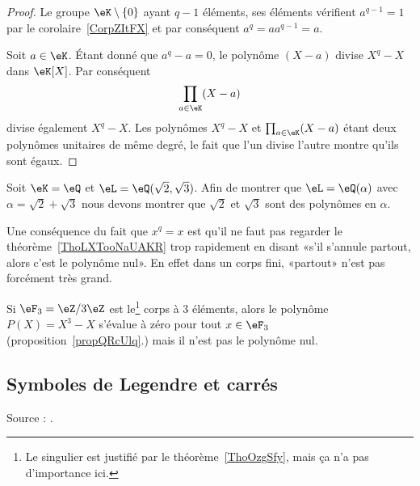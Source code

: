 \begin{proof}
	Le groupe \( \eK\setminus\{ 0 \}\) ayant \( q-1\) éléments, ses éléments vérifient \( a^{q-1}=1\) par le corolaire~\ref{CorpZItFX} et par conséquent \( a^q=aa^{q-1}=a \).

	Soit \( a\in \eK\). Étant donné que \( a^q-a=0\), le polynôme \( (X-a)\) divise \( X^q-X\) dans \( \eK[X]\). Par conséquent
	\begin{equation}
		\prod_{a\in \eK}(X-a)
	\end{equation}
	divise également \( X^q-X\). Les polynômes \( X^q-X\) et \( \prod_{a\in \eK}(X-a)\) étant deux polynômes unitaires de même degré, le fait que l'un divise l'autre montre qu'ils sont égaux.
\end{proof}

\begin{example}
	Soit \( \eK=\eQ\) et \( \eL=\eQ(\sqrt{2},\sqrt{3})\). Afin de montrer que \( \eL=\eQ(\alpha)\) avec \( \alpha=\sqrt{2}+\sqrt{3}\) nous devons montrer que \( \sqrt{2}\) et \( \sqrt{3}\) sont des polynômes en \( \alpha\).
\end{example}

Une conséquence du fait que \( x^q=x\) est qu'il ne faut pas regarder le théorème~\ref{ThoLXTooNaUAKR} trop rapidement en disant «s'il s'annule partout, alors c'est le polynôme nul». En effet dans un corps fini, «partout» n'est pas forcément très grand.

\begin{example}\label{exVQBooBMPLkD}
	Si \( \eF_3=\eZ/3\eZ\) est le\footnote{Le singulier est justifié par le théorème~\ref{ThoOzgSfy}, mais ça n'a pas d'importance ici.} corps à \( 3\)
	éléments, alors le polynôme \( P(X)=X^3-X\) s'évalue à zéro pour tout \( x\in \eF_3\) (proposition~\ref{propQRcUlq}.) mais il n'est pas le polynôme nul.
\end{example}

\subsection{Symboles de Legendre et carrés}

Source : \cite{RecQuadVento}.

